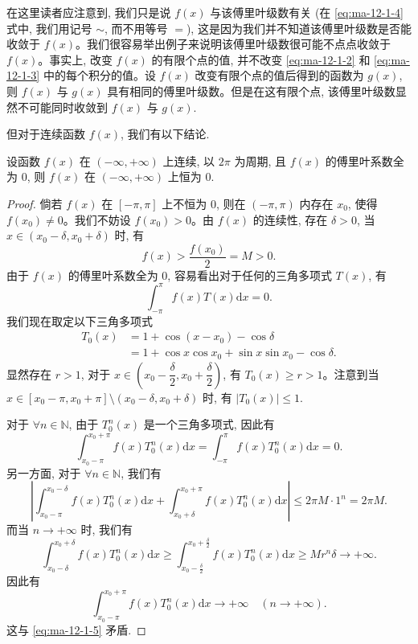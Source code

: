 在这里读者应注意到, 我们只是说 $f(x)$ 与该傅里叶级数有关 (在 \eqref{eq:ma-12-1-4} 式中, 我们用记号 $\sim$, 而不用等号 $=$), 这是因为我们并不知道该傅里叶级数是否能收敛于 $f(x)$。我们很容易举出例子来说明该傅里叶级数很可能不点点收敛于 $f(x)$。事实上, 改变 $f(x)$ 的有限个点的值, 并不改变 \eqref{eq:ma-12-1-2} 和 \eqref{eq:ma-12-1-3} 中的每个积分的值。设 $f(x)$ 改变有限个点的值后得到的函数为 $g(x)$, 则 $f(x)$ 与 $g(x)$ 具有相同的傅里叶级数。但是在这有限个点, 该傅里叶级数显然不可能同时收敛到 $f(x)$ 与 $g(x)$.

但对于连续函数 $f(x)$, 我们有以下结论.

\begin{theorem}\label{theorem:ma-12-1-1}
设函数 $f(x)$ 在 $(-\infty,+\infty)$ 上连续, 以 $2\pi$ 为周期, 且 $f(x)$ 的傅里叶系数全为 $0$, 则 $f(x)$ 在 $(-\infty,+\infty)$ 上恒为 $0$.
\end{theorem}


\begin{proof}
倘若 $f(x)$ 在 $[-\pi,\pi]$ 上不恒为 $0$, 则在 $(-\pi,\pi)$ 内存在 $x_0$, 使得 $f(x_0)\ne0$。我们不妨设 $f(x_0)>0$。由 $f(x)$ 的连续性, 存在 $\delta>0$, 当 $x\in(x_0-\delta,x_0+\delta)$ 时, 有
\[
  f(x)>\frac{f(x_0)}{2}=M>0.
\]
由于 $f(x)$ 的傅里叶系数全为 $0$, 容易看出对于任何的三角多项式 $T(x)$, 有
\[
  \int_{-\pi}^{\pi}f(x)T(x)\mathrm dx=0.
\]
我们现在取定以下三角多项式
\[
\begin{aligned}
  T_0(x)&=1+\cos(x-x_0)-\cos\delta\\
  &=1+\cos x\cos x_0+\sin x\sin x_0-\cos\delta.
\end{aligned}
\]
显然存在 $r>1$, 对于 $x\in\left(x_0-\dfrac{\delta}{2},x_0+\dfrac{\delta}{2}\right)$, 有 $T_0(x)\geqslant r>1$。注意到当 $x\in[x_0-\pi,x_0+\pi]\setminus(x_0-\delta,x_0+\delta)$ 时, 有 $|T_0(x)|\leqslant1$.

对于 $\forall n\in\mathbb N$, 由于 $T_0^n(x)$ 是一个三角多项式, 因此有
\begin{equation}
  \int_{x_0-\pi}^{x_0+\pi}f(x)T_0^n(x)\mathrm dx
  =\int_{-\pi}^{\pi}f(x)T_0^n(x)\mathrm dx=0.
  \label{eq:ma-12-1-5}
\end{equation}
另一方面, 对于 $\forall n\in\mathbb N$, 我们有
\[
  \left|
    \int_{x_0-\pi}^{x_0-\delta}f(x)T_0^n(x)\mathrm dx
    +\int_{x_0+\delta}^{x_0+\pi}f(x)T_0^n(x)\mathrm dx
  \right|\leqslant 2\pi M\cdot1^n=2\pi M.
\]
而当 $n\to+\infty$ 时, 我们有
\[
  \int_{x_0-\delta}^{x_0+\delta}f(x)T_0^n(x)\mathrm dx
  \geqslant \int_{x_0-\frac{\delta}{2}}^{x_0+\frac{\delta}{2}}f(x)T_0^n(x)\mathrm dx
  \geqslant Mr^n\delta\to+\infty.
\]
因此有
\[
  \int_{x_0-\pi}^{x_0+\pi}f(x)T_0^n(x)\mathrm dx\to+\infty
  \quad (n\to+\infty).
\]
这与 \eqref{eq:ma-12-1-5} 矛盾.
\end{proof}


